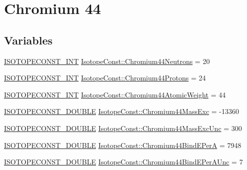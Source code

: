 \hypertarget{group___isotope_const-_chromium-_cr44}{}\section{Chromium 44}
\label{group___isotope_const-_chromium-_cr44}
\subsection*{Variables}
\begin{DoxyCompactItemize}
\item 
\mbox{\hyperlink{group___isotope_const-_macros_ga5f18360b3e99483a35c32d789e62621c}{I\+S\+O\+T\+O\+P\+E\+C\+O\+N\+S\+T\+\_\+\+I\+NT}} \mbox{\hyperlink{group___isotope_const-_chromium-_cr44_ga7b9743533f1275086821f48376bb579e}{Isotope\+Const\+::\+Chromium44\+Neutrons}} = 20
\item 
\mbox{\hyperlink{group___isotope_const-_macros_ga5f18360b3e99483a35c32d789e62621c}{I\+S\+O\+T\+O\+P\+E\+C\+O\+N\+S\+T\+\_\+\+I\+NT}} \mbox{\hyperlink{group___isotope_const-_chromium-_cr44_ga537a8f13ff149e6e9910958f7723be74}{Isotope\+Const\+::\+Chromium44\+Protons}} = 24
\item 
\mbox{\hyperlink{group___isotope_const-_macros_ga5f18360b3e99483a35c32d789e62621c}{I\+S\+O\+T\+O\+P\+E\+C\+O\+N\+S\+T\+\_\+\+I\+NT}} \mbox{\hyperlink{group___isotope_const-_chromium-_cr44_gab95901f81604d8b8c011a24b634533bf}{Isotope\+Const\+::\+Chromium44\+Atomic\+Weight}} = 44
\item 
\mbox{\hyperlink{group___isotope_const-_macros_ga8f45a7272ce02c0b4c65c44636ed719a}{I\+S\+O\+T\+O\+P\+E\+C\+O\+N\+S\+T\+\_\+\+D\+O\+U\+B\+LE}} \mbox{\hyperlink{group___isotope_const-_chromium-_cr44_ga5bc93dc1d6a2c78323f55d2ee8a9c331}{Isotope\+Const\+::\+Chromium44\+Mass\+Exc}} = -\/13360
\item 
\mbox{\hyperlink{group___isotope_const-_macros_ga8f45a7272ce02c0b4c65c44636ed719a}{I\+S\+O\+T\+O\+P\+E\+C\+O\+N\+S\+T\+\_\+\+D\+O\+U\+B\+LE}} \mbox{\hyperlink{group___isotope_const-_chromium-_cr44_gaace8f6cb07c8daa2f6fa02586f7c57f3}{Isotope\+Const\+::\+Chromium44\+Mass\+Exc\+Unc}} = 300
\item 
\mbox{\hyperlink{group___isotope_const-_macros_ga8f45a7272ce02c0b4c65c44636ed719a}{I\+S\+O\+T\+O\+P\+E\+C\+O\+N\+S\+T\+\_\+\+D\+O\+U\+B\+LE}} \mbox{\hyperlink{group___isotope_const-_chromium-_cr44_ga78a199af93f916420780eabaa50d2ca4}{Isotope\+Const\+::\+Chromium44\+Bind\+E\+PerA}} = 7948
\item 
\mbox{\hyperlink{group___isotope_const-_macros_ga8f45a7272ce02c0b4c65c44636ed719a}{I\+S\+O\+T\+O\+P\+E\+C\+O\+N\+S\+T\+\_\+\+D\+O\+U\+B\+LE}} \mbox{\hyperlink{group___isotope_const-_chromium-_cr44_gaf82d4bd445d9e6979ed4a789d739ac2e}{Isotope\+Const\+::\+Chromium44\+Bind\+E\+Per\+A\+Unc}} = 7

\end{DoxyCompactItemize}
